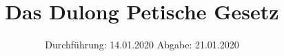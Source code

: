 

\subject{V201}
\title{Das Dulong Petische Gesetz}
\date{%
  Durchführung: 14.01.2020
  \hspace{3em}
  Abgabe: 21.01.2020
}



\maketitle
\thispagestyle{empty}
\tableofcontents
\newpage








\printbibliography{}


